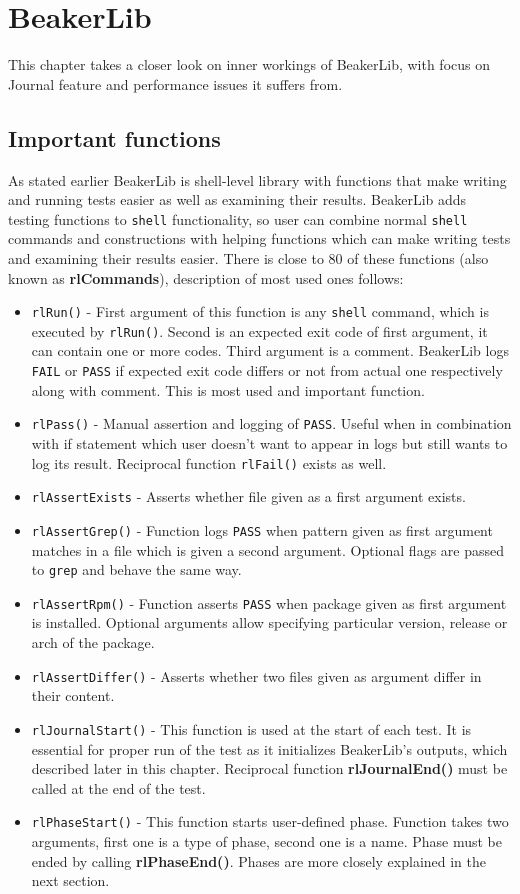 \chapter{BeakerLib}
\label{beakerlib_chapter}

This chapter takes a closer look on inner workings of BeakerLib, with focus on Journal feature and performance issues it suffers from. 

\section{Important functions}
As stated earlier BeakerLib is shell-level library with functions that make writing and running tests easier as well as examining their results.
BeakerLib adds testing functions to \texttt{shell} functionality, so user can combine normal \texttt{shell} commands and constructions with helping functions which can make writing tests and examining their results easier. There is close to 80 of these functions (also known as \textbf{rlCommands}), description of most used ones follows:
\begin{itemize}
\item \texttt{rlRun()} - First argument of this function is any \texttt{shell} command, which is executed by \texttt{rlRun()}. Second is an expected exit code of first argument, it can contain one or more codes. Third argument is a comment. BeakerLib logs \texttt{FAIL} or \texttt{PASS} if expected exit code differs or not from actual one respectively along with comment. This is most used and important function.
\item \texttt{rlPass()} - Manual assertion and logging of \texttt{PASS}. Useful when in combination with if statement which user doesn't want to appear in logs but still wants to log its result. Reciprocal function \texttt{rlFail()} exists as well.
\item \texttt{rlAssertExists} - Asserts whether file given as a first argument exists.
\item \texttt{rlAssertGrep()} - Function logs \texttt{PASS} when pattern given as first argument matches in a file which is given a second argument. Optional flags are passed to \texttt{grep} and behave the same way.
\item \texttt{rlAssertRpm()} - Function asserts \texttt{PASS} when package given as first argument is installed.  Optional arguments allow specifying particular version, release or arch of the package.
\item \texttt{rlAssertDiffer()} - Asserts whether two files given as argument differ in their content. 
\item \texttt{rlJournalStart()} - This function is used at the start of each test. It is essential for proper run of the test as it initializes BeakerLib's  outputs, which described later in this chapter. Reciprocal function \textbf{rlJournalEnd()} must be called at the end of the test.
\item \texttt{rlPhaseStart()} - This function starts user-defined phase. Function takes two arguments, first one is a type of phase, second one is a name. Phase must be ended by calling \textbf{rlPhaseEnd()}. Phases are more closely explained in the next section.
\end{itemize}

